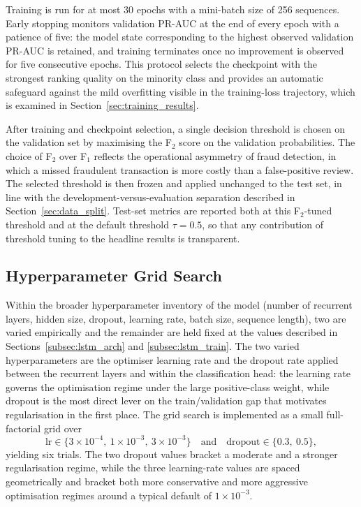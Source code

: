 \documentclass[oneside,12pt,parskip=half,american,numbers=noenddot]{scrreprt}
\begin{document}
Training is run for at most 30 epochs with a mini-batch size of 256 sequences. Early stopping monitors validation PR-AUC at the end of every epoch with a patience of five: the model state corresponding to the highest observed validation PR-AUC is retained, and training terminates once no improvement is observed for five consecutive epochs. This protocol selects the checkpoint with the strongest ranking quality on the minority class and provides an automatic safeguard against the mild overfitting visible in the training-loss trajectory, which is examined in Section~\ref{sec:training_results}.

After training and checkpoint selection, a single decision threshold is chosen on the validation set by maximising the F$_2$ score on the validation probabilities. The choice of F$_2$ over F$_1$ reflects the operational asymmetry of fraud detection, in which a missed fraudulent transaction is more costly than a false-positive review. The selected threshold is then frozen and applied unchanged to the test set, in line with the development-versus-evaluation separation described in Section~\ref{sec:data_split}. Test-set metrics are reported both at this F$_2$-tuned threshold and at the default threshold $\tau = 0.5$, so that any contribution of threshold tuning to the headline results is transparent.

\subsection{Hyperparameter Grid Search}
\label{subsec:lstm_grid}

Within the broader hyperparameter inventory of the model (number of recurrent layers, hidden size, dropout, learning rate, batch size, sequence length), two are varied empirically and the remainder are held fixed at the values described in Sections~\ref{subsec:lstm_arch} and \ref{subsec:lstm_train}. The two varied hyperparameters are the optimiser learning rate and the dropout rate applied between the recurrent layers and within the classification head: the learning rate governs the optimisation regime under the large positive-class weight, while dropout is the most direct lever on the train/validation gap that motivates regularisation in the first place. The grid search is implemented as a small full-factorial grid over
\[
\text{lr} \in \{3\times 10^{-4},\ 1\times 10^{-3},\ 3\times 10^{-3}\}
\quad \text{and} \quad
\text{dropout} \in \{0.3,\ 0.5\},
\]
yielding six trials. The two dropout values bracket a moderate and a stronger regularisation regime, while the three learning-rate values are spaced geometrically and bracket both more conservative and more aggressive optimisation regimes around a typical default of $1\times 10^{-3}$.
\end{document}
